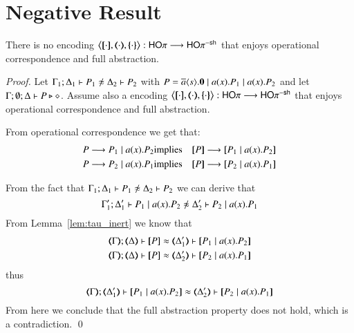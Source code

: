 \section{Negative Result}
\label{app:neg}

\begin{theorem}\rm
	There is no encoding $\enco{\map{\cdot}, \mapt{\cdot}, \mapa{\cdot}}: \HOp \longrightarrow \HOp^{\minussh}$
	that enjoys operational correspondence and full abstraction.
\end{theorem}

\begin{proof}
	Let $\horel{\Gamma_1}{\Delta_1}{P_1}{\not\wb}{\Delta_2}{P_2}$
	with $P = \overline{a} \langle s \rangle . \mathbf{0} \;|\; a (x) . P_1 \;|\; a (x) . P_2$ and
	let $\Gamma; \emptyset; \Delta \vdash P \triangleright \diamond$.
	Assume also a encoding
	$\enco{\map{\cdot}, \mapt{\cdot}, \mapa{\cdot}}: \HOp \longrightarrow \HOp^{\minussh}$
	that enjoys
	operational correspondence and full abstraction.

	From operational correspondence we get that:
	\begin{eqnarray*}
		P \red P_1 \Par \bacc{a}{x} P_2 &\textrm{implies}& \map{P} \red \map{P_1 \Par \bacc{a}{x} P_2}\\
		P \red P_2 \Par \bacc{a}{x} P_1 &\textrm{implies}& \map{P} \red \map{P_2 \Par \bacc{a}{x} P_1}
	\end{eqnarray*}

	From the fact that
	$\horel{\Gamma_1}{\Delta_1}{P_1}{\not\wb}{\Delta_2}{P_2}$
	we can derive that
%
	\[
		\horel{\Gamma_1'}{\Delta_1'}{P_1 \Par \bacc{a}{x} P_2}{\not\wb}{\Delta_2'}{P_2 \Par \bacc{a}{x} P_1}
	\]
%
	From Lemma~\ref{lem:tau_inert} we know that
%
	\begin{eqnarray*}
		\horel{\mapt{\Gamma}}{\mapt{\Delta}}{\map{P}}{\wb}{\mapt{\Delta_1'}}{\map{P_1 \Par \bacc{a}{x} P_2}}\\
		\horel{\mapt{\Gamma}}{\mapt{\Delta}}{\map{P}}{\wb}{\mapt{\Delta_2'}}{\map{P_2 \Par \bacc{a}{x} P_1}}
	\end{eqnarray*}
%
	\noi thus
	\[
		\horel{\mapt{\Gamma}}{\mapt{\Delta_1'}}{\map{P_1 \Par \bacc{a}{x} P_2}}{\wb}{\mapt{\Delta_2'}}{\map{P_2 \Par \bacc{a}{x} P_1}}
	\]
%
	From here we conclude that the full abstraction property does not hold,
	which is a contradiction.
	\qed
\end{proof}
